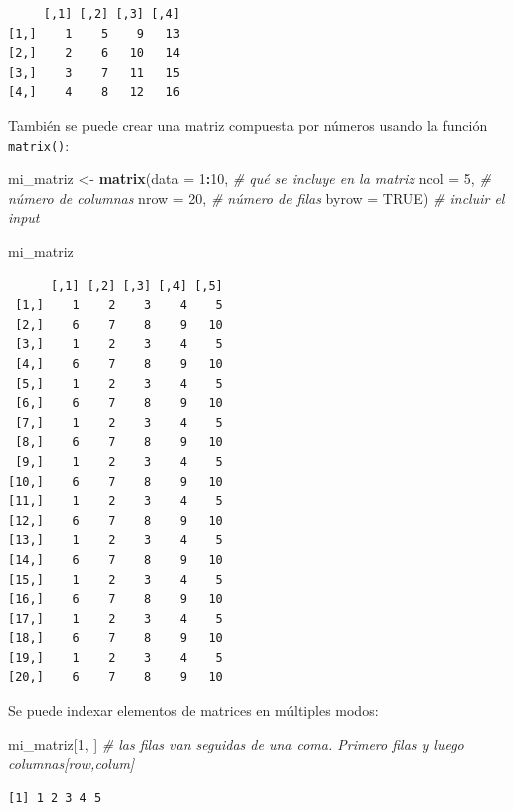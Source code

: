 \documentclass[
]{article}
\newenvironment{Shaded}{\begin{snugshade}}{\end{snugshade}}
\newcommand{\AttributeTok}[1]{\textcolor[rgb]{0.13,0.29,0.53}{#1}}
\newcommand{\CommentTok}[1]{\textcolor[rgb]{0.56,0.35,0.01}{\textit{#1}}}
\newcommand{\ConstantTok}[1]{\textcolor[rgb]{0.56,0.35,0.01}{#1}}
\newcommand{\DecValTok}[1]{\textcolor[rgb]{0.00,0.00,0.81}{#1}}
\newcommand{\FunctionTok}[1]{\textcolor[rgb]{0.13,0.29,0.53}{\textbf{#1}}}
\newcommand{\NormalTok}[1]{#1}
\newcommand{\OtherTok}[1]{\textcolor[rgb]{0.56,0.35,0.01}{#1}}
\newcommand{\SpecialCharTok}[1]{\textcolor[rgb]{0.81,0.36,0.00}{\textbf{#1}}}
\begin{document}
\begin{verbatim}
     [,1] [,2] [,3] [,4]
[1,]    1    5    9   13
[2,]    2    6   10   14
[3,]    3    7   11   15
[4,]    4    8   12   16
\end{verbatim}

También se puede crear una matriz compuesta por números usando la función \texttt{matrix()}:

\begin{Shaded}
\begin{Highlighting}[]
\NormalTok{mi\_matriz }\OtherTok{\textless{}{-}} \FunctionTok{matrix}\NormalTok{(}\AttributeTok{data =} \DecValTok{1}\SpecialCharTok{:}\DecValTok{10}\NormalTok{, }\CommentTok{\# qué se incluye en la matriz}
                    \AttributeTok{ncol =} \DecValTok{5}\NormalTok{, }\CommentTok{\# número de columnas}
                    \AttributeTok{nrow =} \DecValTok{20}\NormalTok{, }\CommentTok{\# número de filas}
                    \AttributeTok{byrow =} \ConstantTok{TRUE}\NormalTok{) }\CommentTok{\# incluir el input}

\NormalTok{mi\_matriz}
\end{Highlighting}
\end{Shaded}

\begin{verbatim}
      [,1] [,2] [,3] [,4] [,5]
 [1,]    1    2    3    4    5
 [2,]    6    7    8    9   10
 [3,]    1    2    3    4    5
 [4,]    6    7    8    9   10
 [5,]    1    2    3    4    5
 [6,]    6    7    8    9   10
 [7,]    1    2    3    4    5
 [8,]    6    7    8    9   10
 [9,]    1    2    3    4    5
[10,]    6    7    8    9   10
[11,]    1    2    3    4    5
[12,]    6    7    8    9   10
[13,]    1    2    3    4    5
[14,]    6    7    8    9   10
[15,]    1    2    3    4    5
[16,]    6    7    8    9   10
[17,]    1    2    3    4    5
[18,]    6    7    8    9   10
[19,]    1    2    3    4    5
[20,]    6    7    8    9   10
\end{verbatim}

Se puede indexar elementos de matrices en múltiples modos:

\begin{Shaded}
\begin{Highlighting}[]
\NormalTok{mi\_matriz[}\DecValTok{1}\NormalTok{, ]  }\CommentTok{\# las filas van seguidas de una coma. Primero filas y luego columnas[row,colum]}
\end{Highlighting}
\end{Shaded}

\begin{verbatim}
[1] 1 2 3 4 5
\end{verbatim}
\end{document}
